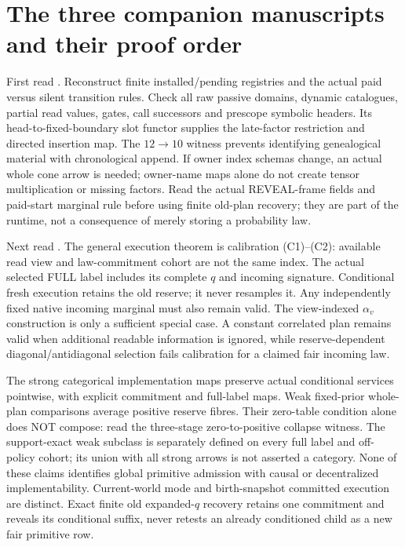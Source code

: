 \documentclass{article}
\begin{document}
\section{The three companion manuscripts and their proof order}
First read  . Reconstruct finite installed/pending registries and the actual paid versus silent transition rules. Check all raw passive domains, dynamic catalogues, partial read values, gates, call successors and prescope symbolic headers. Its head-to-fixed-boundary slot functor supplies the late-factor restriction and directed insertion map. The $12\to10$ witness prevents identifying genealogical material with chronological append. If owner index schemas change, an actual whole cone arrow is needed; owner-name maps alone do not create tensor multiplication or missing factors. Read the actual REVEAL-frame fields and paid-start marginal rule before using finite old-plan recovery; they are part of the runtime, not a consequence of merely storing a probability law.

Next read  . The general execution theorem is calibration (C1)--(C2): available read view and law-commitment cohort are not the same index. The actual selected FULL label includes its complete $q$ and incoming signature. Conditional fresh execution retains the old reserve; it never resamples it. Any independently fixed native incoming marginal must also remain valid. The view-indexed $\alpha_v$ construction is only a sufficient special case. A constant correlated plan remains valid when additional readable information is ignored, while reserve-dependent diagonal/antidiagonal selection fails calibration for a claimed fair incoming law.

The strong categorical implementation maps preserve actual conditional services pointwise, with explicit commitment and full-label maps. Weak fixed-prior whole-plan comparisons average positive reserve fibres. Their zero-table condition alone does NOT compose: read the three-stage zero-to-positive collapse witness. The support-exact weak subclass is separately defined on every full label and off-policy cohort; its union with all strong arrows is not asserted a category. None of these claims identifies global primitive admission with causal or decentralized implementability. Current-world mode and birth-snapshot committed execution are distinct. Exact finite old expanded-$q$ recovery retains one commitment and reveals its conditional suffix, never retests an already conditioned child as a new fair primitive row.
\end{document}
